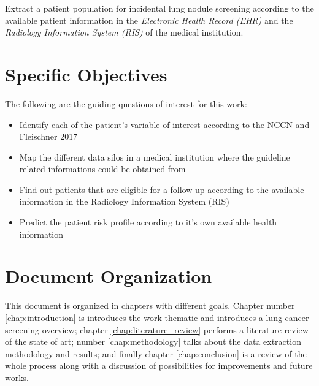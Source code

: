 Extract a patient population for incidental lung nodule screening according to the available patient information in the \emph{Electronic Health Record (EHR)} and the \emph{Radiology Information System (RIS)} of the medical institution. 

\section{Specific Objectives}

The following are the guiding questions of interest for this work:

\begin{itemize}
  \item Identify each of the patient's variable of interest according to the NCCN and Fleischner 2017
  \item Map the different data silos in a medical institution where the guideline related informations could be obtained from
  \item Find out patients that are eligible for a follow up according to the available information in the Radiology Information System (RIS)
  \item Predict the patient risk profile according to it's own available health information
\end{itemize}

\section{Document Organization}

This document is organized in chapters with different goals. Chapter number \ref{chap:introduction} is introduces the work thematic and introduces a lung cancer screening overview; chapter \ref{chap:literature_review} performs a literature review of the state of art; number \ref{chap:methodology} talks about the data extraction methodology and results; and finally chapter \ref{chap:conclusion} is a review of the whole process along with a discussion of possibilities for improvements and future works.

